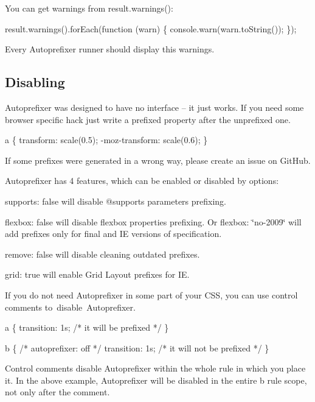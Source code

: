 You can get warnings from {\ttfamily result.\+warnings()}\+:


\begin{DoxyCode}
result.warnings().forEach(function (warn) \{
    console.warn(warn.toString());
\});
\end{DoxyCode}


Every Autoprefixer runner should display this warnings.

\subsection*{Disabling}

Autoprefixer was designed to have no interface – it just works. If you need some browser specific hack just write a prefixed property after the unprefixed one.


\begin{DoxyCode}
a \{
    transform: scale(0.5);
    -moz-transform: scale(0.6);
\}
\end{DoxyCode}


If some prefixes were generated in a wrong way, please create an issue on Git\+Hub.

Autoprefixer has 4 features, which can be enabled or disabled by options\+:


\begin{DoxyItemize}
\item {\ttfamily supports\+: false} will disable {\ttfamily @supports} parameters prefixing.
\item {\ttfamily flexbox\+: false} will disable flexbox properties prefixing. Or {\ttfamily flexbox\+: \char`\"{}no-\/2009\char`\"{}} will add prefixes only for final and IE versions of specification.
\item {\ttfamily remove\+: false} will disable cleaning outdated prefixes.
\item {\ttfamily grid\+: true} will enable Grid Layout prefixes for IE.
\end{DoxyItemize}

If you do not need Autoprefixer in some part of your C\+SS, you can use control comments to disable \+Autoprefixer.


\begin{DoxyCode}
a \{
    transition: 1s; /* it will be prefixed */
\}

b \{
    /* autoprefixer: off */
    transition: 1s; /* it will not be prefixed */
\}
\end{DoxyCode}


Control comments disable Autoprefixer within the whole rule in which you place it. In the above example, Autoprefixer will be disabled in the entire {\ttfamily b} rule scope, not only after the comment.

